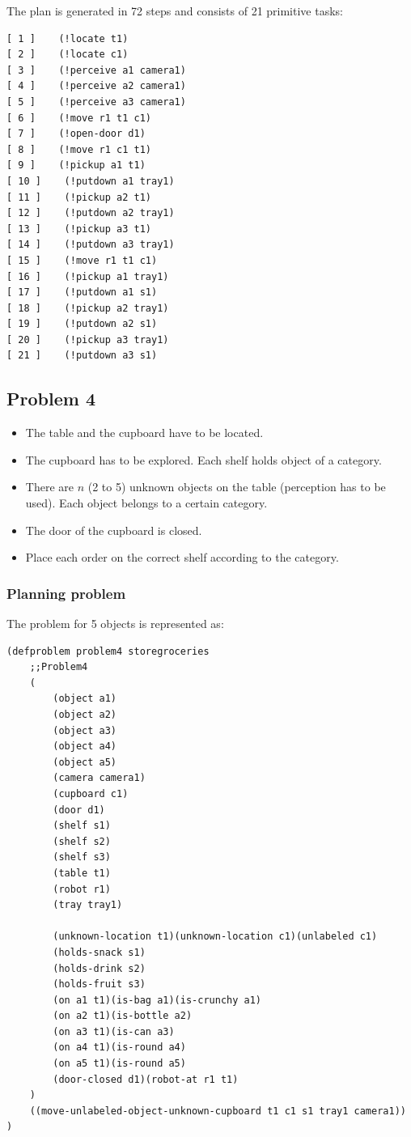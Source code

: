 \documentclass[paper=a4, fontsize=11pt]{scrartcl}
\begin{document}
The plan is generated in 72 steps and consists of 21 primitive tasks: \\

\begin{lstlisting}
[ 1 ]    (!locate t1)
[ 2 ]    (!locate c1)
[ 3 ]    (!perceive a1 camera1)
[ 4 ]    (!perceive a2 camera1)
[ 5 ]    (!perceive a3 camera1)
[ 6 ]    (!move r1 t1 c1)
[ 7 ]    (!open-door d1)
[ 8 ]    (!move r1 c1 t1)
[ 9 ]    (!pickup a1 t1)
[ 10 ]    (!putdown a1 tray1)
[ 11 ]    (!pickup a2 t1)
[ 12 ]    (!putdown a2 tray1)
[ 13 ]    (!pickup a3 t1)
[ 14 ]    (!putdown a3 tray1)
[ 15 ]    (!move r1 t1 c1)
[ 16 ]    (!pickup a1 tray1)
[ 17 ]    (!putdown a1 s1)
[ 18 ]    (!pickup a2 tray1)
[ 19 ]    (!putdown a2 s1)
[ 20 ]    (!pickup a3 tray1)
[ 21 ]    (!putdown a3 s1)
\end{lstlisting}
		
	
	\subsection{Problem 4}
	
		\begin{itemize}
			\item The table and the cupboard have to be located.
			\item The cupboard has to be explored. Each shelf holds object of a category.
			\item There are $n$ (2 to 5) unknown objects on the table (perception has to be used). Each object belongs to a certain category.
			\item The door of the cupboard is closed.
			\item Place each order on the correct shelf according to the category.
		\end{itemize}
	
	\subsubsection*{Planning problem}
	
	The problem for 5 objects is represented as: \\
	
	\begin{lstlisting}
(defproblem problem4 storegroceries
	;;Problem4
	(
		(object a1)
		(object a2)
		(object a3)
		(object a4)
		(object a5)
		(camera camera1)
		(cupboard c1)
		(door d1)
		(shelf s1)
		(shelf s2)
		(shelf s3)
		(table t1)
		(robot r1)
		(tray tray1)
		
		(unknown-location t1)(unknown-location c1)(unlabeled c1)
		(holds-snack s1)
		(holds-drink s2)
		(holds-fruit s3)
		(on a1 t1)(is-bag a1)(is-crunchy a1)
		(on a2 t1)(is-bottle a2)
		(on a3 t1)(is-can a3)
		(on a4 t1)(is-round a4)
		(on a5 t1)(is-round a5)
		(door-closed d1)(robot-at r1 t1)
	)
	((move-unlabeled-object-unknown-cupboard t1 c1 s1 tray1 camera1))
)
	\end{lstlisting}
	
\end{document}
